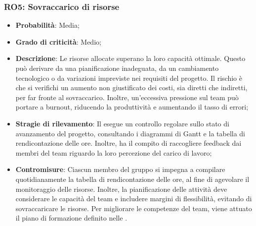 \subsubsection{RO5: Sovraccarico di risorse}
\begin{itemize}
    \item \textbf{Probabilità}: Media;
    \item \textbf{Grado di criticità}: Medio;
    \item \textbf{Descrizione}: Le risorse allocate superano la loro capacità ottimale. Questo può derivare da una pianificazione inadeguata, da un cambiamento tecnologico o da variazioni impreviste nei requisiti del progetto. Il rischio è che si verifichi un aumento non giustificato dei costi, sia diretti che indiretti, per far fronte al sovraccarico. Inoltre, un'eccessiva pressione sul team può portare a burnout, riducendo la produttività e aumentando il tasso di errori;
    \item \textbf{Stragie di rilevamento}: Il \Responsabile{} esegue un controllo regolare sullo stato di avanzamento del progetto, consultando i diagrammi di Gantt e la tabella di rendicontazione delle ore. Inoltre, ha il compito di raccogliere feedback dai membri del team riguardo la loro percezione del carico di lavoro;
    \item \textbf{Contromisure}: Ciascun membro del gruppo si impegna a compilare quotidianamente la tabella di rendicontazione delle ore, al fine di agevolare il monitoraggio delle risorse. Inoltre, la pianificazione delle attività deve considerare le capacità del team e includere margini di flessibilità, evitando di sovraccaricare le risorse. Per migliorare le competenze del team, viene attuato il piano di formazione definito nelle \NormeDiProgetto.
\end{itemize}
